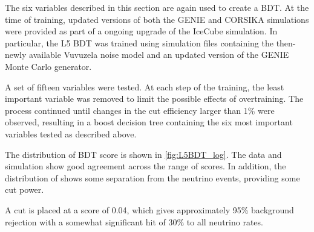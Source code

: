 The six variables described in this section are again used to create a BDT. 
At the time of training, updated versions of both the GENIE and CORSIKA simulations were provided as part of a ongoing upgrade of the IceCube simulation.
In particular, the L5 BDT was trained using simulation files containing the then-newly available Vuvuzela noise model and an updated version of the GENIE Monte Carlo generator.

A set of fifteen variables were tested.
At each step of the training, the least important variable was removed to limit the possible effects of overtraining.
The process continued until changes in the cut efficiency larger than 1\% were observed, resulting in a boost decision tree containing the six most important variables tested as described above.

The distribution of BDT score is shown in \ref{fig:L5BDT_log}. 
The data and simulation show good agreement across the range of scores.
In addition, the distribution of shows some separation from the neutrino events, providing some cut power.

A cut is placed at a score of 0.04, which gives approximately 95\% background rejection with a somewhat significant hit of 30\% to all neutrino rates.




